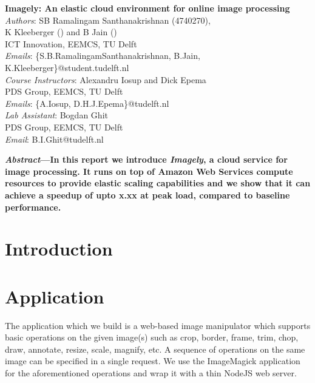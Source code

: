 \documentclass[a4paper, sigconf, twocolumn]{acmart}
\begin{document}

\begin{center}
  \textbf{\LARGE{
    Imagely: An elastic cloud environment for online image processing
  }}\\
  \vspace{0.25cm}
  \emph{Authors}: SB Ramalingam Santhanakrishnan (4740270), \\ K Kleeberger () and B Jain ()\\
  ICT Innovation, EEMCS, TU Delft\\
  \emph{Emails}: \{S.B.RamalingamSanthanakrishnan, B.Jain, K.Kleeberger\}@student.tudelft.nl\\
  \vspace{0.2cm}
  \emph{Course Instructors}: Alexandru Iosup and Dick Epema\\
  PDS Group, EEMCS, TU Delft\\
  \emph{Emails}: \{A.Iosup, D.H.J.Epema\}@tudelft.nl\\
  \vspace{0.2cm}
  \emph{Lab Assistant}: Bogdan Ghit\\
  PDS Group, EEMCS, TU Delft\\
  \emph{Email}: B.I.Ghit@tudelft.nl\\
\end{center}

\vspace{0.2cm}

\textbf{
  \emph{Abstract}---In this report we introduce \emph{Imagely}, a cloud service for image processing.
  It runs on top of Amazon Web Services compute resources to provide elastic scaling capabilities and
  we show that it can achieve a speedup of upto x.xx at peak load, compared to baseline performance.
}

\section{Introduction}

\section{Application}

The application which we build is a web-based image manipulator which
supports basic operations on the given image(s) such as crop, border, 
frame, trim, chop, draw, annotate, resize, scale, magnify, etc. 
A sequence of operations on the same image can be specified in a single
request. We use the ImageMagick\cite{imagemagick} application for the
aforementioned operations and wrap it with a thin NodeJS\cite{nodejs} web server.
\end{document}
